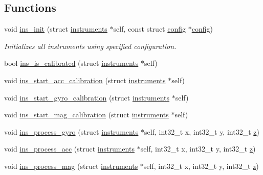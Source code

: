 \subsection*{Functions}
\begin{DoxyCompactItemize}
\item 
void \hyperlink{group__Instruments__Main_ga53391073103ee8a597b27ee707baf6d5}{ins\+\_\+init} (struct \hyperlink{structinstruments}{instruments} $\ast$self, const struct \hyperlink{structconfig}{config} $\ast$\hyperlink{structconfig}{config})
\begin{DoxyCompactList}\small\item\em Initializes all instruments using specified configuration. \end{DoxyCompactList}\item 
bool \hyperlink{group__Instruments__Main_gad94176bbfa1cc3c1548ee241787eb98a}{ins\+\_\+is\+\_\+calibrated} (struct \hyperlink{structinstruments}{instruments} $\ast$self)
\item 
void \hyperlink{group__Instruments__Main_ga20231fe90708aed1062e8ee4b5c9c695}{ins\+\_\+start\+\_\+acc\+\_\+calibration} (struct \hyperlink{structinstruments}{instruments} $\ast$self)
\item 
void \hyperlink{group__Instruments__Main_ga177072b7ee3259c7c95181002ff587b6}{ins\+\_\+start\+\_\+gyro\+\_\+calibration} (struct \hyperlink{structinstruments}{instruments} $\ast$self)
\item 
void \hyperlink{group__Instruments__Main_ga3377f93808683a90ec4de025409e5cbf}{ins\+\_\+start\+\_\+mag\+\_\+calibration} (struct \hyperlink{structinstruments}{instruments} $\ast$self)
\item 
void \hyperlink{group__Instruments__Main_ga87572d36a8af9fcad5d632a721ed671d}{ins\+\_\+process\+\_\+gyro} (struct \hyperlink{structinstruments}{instruments} $\ast$self, int32\+\_\+t x, int32\+\_\+t y, int32\+\_\+t \hyperlink{accelerometer_8h_ab3539ae3820541b70d17c66cfc5a0e3f}{z})
\item 
void \hyperlink{group__Instruments__Main_gac934734b50dd3838f4d8056a20e714b6}{ins\+\_\+process\+\_\+acc} (struct \hyperlink{structinstruments}{instruments} $\ast$self, int32\+\_\+t x, int32\+\_\+t y, int32\+\_\+t \hyperlink{accelerometer_8h_ab3539ae3820541b70d17c66cfc5a0e3f}{z})
\item 
void \hyperlink{group__Instruments__Main_gab819d65960b422c029b6b65c5e093615}{ins\+\_\+process\+\_\+mag} (struct \hyperlink{structinstruments}{instruments} $\ast$self, int32\+\_\+t x, int32\+\_\+t y, int32\+\_\+t \hyperlink{accelerometer_8h_ab3539ae3820541b70d17c66cfc5a0e3f}{z})

\end{DoxyCompactItemize}
